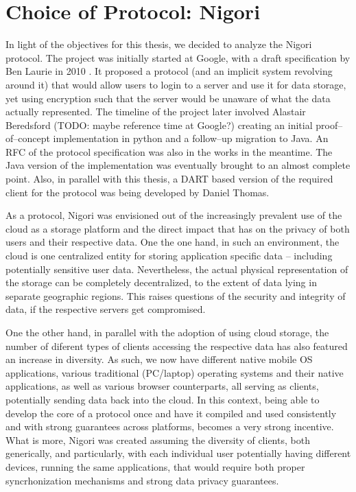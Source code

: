 \section{Choice of Protocol: Nigori}
In light of the objectives for this thesis, we decided to analyze the Nigori protocol.
The project was initially started at Google, with a draft specification by Ben Laurie in 2010 \cite{NigoriDraft}.
It proposed a protocol (and an implicit system revolving around it) that would allow users to login to a server and use it for data storage, yet using encryption such that the server would be unaware of what the data actually represented.
The timeline of the project later involved Alastair Beredsford (TODO: maybe reference time at Google?) creating an initial proof--of--concept implementation in python and a follow--up migration to Java.
An RFC \cite{NigoriRFC} of the protocol specification was also in the works in the meantime.
The Java version of the implementation was eventually brought to an almost complete point.
Also, in parallel with this thesis, a DART \cite{DART} based version of the required client for the protocol was being developed by Daniel Thomas.

As a protocol, Nigori was envisioned out of the increasingly prevalent use of the cloud as a storage platform and the direct impact that has on the privacy of both users and their respective data.
One the one hand, in such an environment, the cloud is one centralized entity for storing application specific data -- including potentially sensitive user data.
Nevertheless, the actual physical representation of the storage can be completely decentralized, to the extent of data lying in separate geographic regions.
This raises questions of the security and integrity of data, if the respective servers get compromised.

One the other hand, in parallel with the adoption of using cloud storage, the number of diferent types of clients accessing the respective data has also featured an increase in diversity.
As such, we now have different native mobile OS applications, various traditional (PC/laptop) operating systems and their native applications, as well as various browser counterparts, all serving as clients, potentially sending data back into the cloud.
In this context, being able to develop the core of a protocol once and have it compiled and used consistently and with strong guarantees across platforms, becomes a very strong incentive.
What is more, Nigori was created assuming the diversity of clients, both generically, and particularly, with each individual user potentially having different devices, running the same applications, that would require both proper syncrhonization mechanisms and strong data privacy guarantees.

